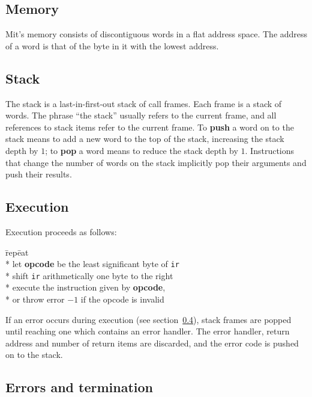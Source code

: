 \documentclass[a4paper]{article}
\begin{document}
\subsection{Memory}

Mit's memory consists of discontiguous words in a flat address space. The address of a word is that of the byte in it with the lowest address.


\subsection{Stack}

The stack is a last-in-first-out stack of call frames. Each frame is a stack of words. The phrase “the stack” usually refers to the current frame, and all references to stack items refer to the current frame. To {\bf push} a word on to the stack means to add a new word to the top of the stack, increasing the stack depth by $1$; to {\bf pop} a word means to reduce the stack depth by $1$. Instructions that change the number of words on the stack implicitly pop their arguments and push their results.


\subsection{Execution}
\label{execution}

Execution proceeds as follows:

\begin{tabbing}
\hspace{0.2in}\=rep\=eat\+\+ \\*
let \textbf{opcode} be the least significant byte of {\tt ir} \\*
shift {\tt ir} arithmetically one byte to the right \\*
execute the instruction given by \textbf{opcode}, \\*
\hspace{1em}or throw error $-1$ if the opcode is invalid \-
\end{tabbing}

\noindent If an error occurs during execution (see section~\ref{errors}),
stack frames are popped until reaching one which contains an error handler.
The error handler, return address and number of return items are discarded,
and the error code is pushed on to the stack.


\subsection{Errors and termination}
\label{errors}
\end{document}
